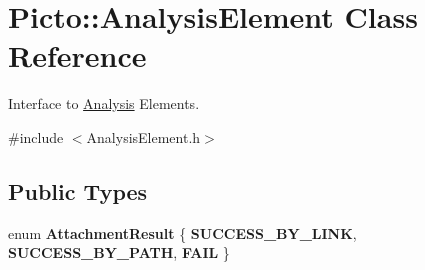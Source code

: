 \hypertarget{class_picto_1_1_analysis_element}{\section{Picto\-:\-:Analysis\-Element Class Reference}
\label{class_picto_1_1_analysis_element}
}


Interface to \hyperlink{class_picto_1_1_analysis}{Analysis} Elements.  




{\ttfamily \#include $<$Analysis\-Element.\-h$>$}

\subsection*{Public Types}
\begin{DoxyCompactItemize}
\item 
enum {\bfseries Attachment\-Result} \{ {\bfseries S\-U\-C\-C\-E\-S\-S\-\_\-\-B\-Y\-\_\-\-L\-I\-N\-K}, 
{\bfseries S\-U\-C\-C\-E\-S\-S\-\_\-\-B\-Y\-\_\-\-P\-A\-T\-H}, 
{\bfseries F\-A\-I\-L}
 \}
\end{DoxyCompactItemize}
